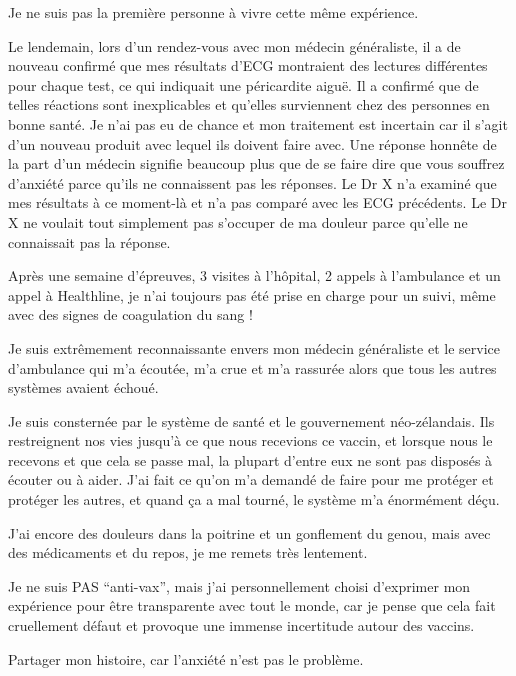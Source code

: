 Je ne suis pas la première personne à vivre cette même expérience.

Le lendemain, lors d'un rendez-vous avec mon médecin généraliste, il a de
nouveau confirmé que mes résultats d'ECG montraient des lectures différentes
pour chaque test, ce qui indiquait une péricardite aiguë. Il a confirmé que de
telles réactions sont inexplicables et qu'elles surviennent chez des personnes
en bonne santé. Je n'ai pas eu de chance et mon traitement est incertain car il
s'agit d'un nouveau produit avec lequel ils doivent faire avec. Une réponse
honnête de la part d'un médecin signifie beaucoup plus que de se faire dire que
vous souffrez d'anxiété parce qu'ils ne connaissent pas les réponses. Le Dr X
n'a examiné que mes résultats à ce moment-là et n'a pas comparé avec les ECG
précédents. Le Dr X ne voulait tout simplement pas s'occuper de ma douleur parce
qu'elle ne connaissait pas la réponse.

Après une semaine d'épreuves, 3 visites à l'hôpital, 2 appels à l'ambulance et
un appel à Healthline, je n'ai toujours pas été prise en charge pour un suivi,
même avec des signes de coagulation du sang !

Je suis extrêmement reconnaissante envers mon médecin généraliste et le service
d'ambulance qui m'a écoutée, m'a crue et m'a rassurée alors que tous les autres
systèmes avaient échoué.

Je suis consternée par le système de santé et le gouvernement néo-zélandais. Ils
restreignent nos vies jusqu'à ce que nous recevions ce vaccin, et lorsque nous
le recevons et que cela se passe mal, la plupart d'entre eux ne sont pas
disposés à écouter ou à aider. J'ai fait ce qu'on m'a demandé de faire pour me
protéger et protéger les autres, et quand ça a mal tourné, le système m'a
énormément déçu.

J'ai encore des douleurs dans la poitrine et un gonflement du genou, mais avec
des médicaments et du repos, je me remets très lentement.

Je ne suis PAS “anti-vax”, mais j'ai personnellement choisi d'exprimer mon
expérience pour être transparente avec tout le monde, car je pense que cela fait
cruellement défaut et provoque une immense incertitude autour des vaccins.

Partager mon histoire, car l'anxiété n'est pas le problème.
